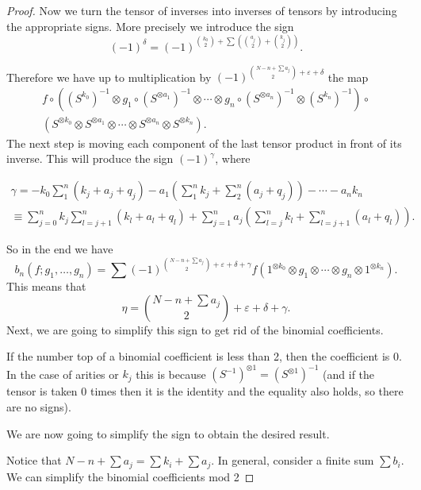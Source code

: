 \documentclass[Thesis.tex]{subfiles}
\begin{document}
\begin{proof}
 Now we turn the tensor of inverses into inverses of tensors by introducing the appropriate signs. More precisely we introduce the sign
 \begin{equation}\label{delta}
 (-1)^{\delta}=(-1)^{\binom{k_0}{2}+\sum(\binom{a_j}{2}+\binom{k_j}{2})}.
  \end{equation}
 
  
Therefore we have up to multiplication by $(-1)^{\binom{N-n+\sum a_j}{2}+\varepsilon+\delta}$ the map
\begin{gather*}
 f\circ((S^{k_0})^{-1}\otimes  g_1\circ (S^{\otimes a_1})^{-1}\otimes\cdots \otimes  g_n\circ (S^{\otimes a_n})^{-1}\otimes  (S^{k_n})^{-1})\circ\\ (S^{\otimes k_0}\otimes S^{\otimes a_1}\otimes\cdots\otimes S^{\otimes a_n}\otimes S^{\otimes k_n}).
 \end{gather*}
 The next step is moving each component of the last tensor product in front of its inverse. This will produce the sign $(-1)^\gamma$, where
 
 \begin{gather*}\gamma=-k_0\sum_1^n(k_j+a_j+q_j)-a_1\left(\sum_1^n k_j+\sum_2^n (a_j+q_j)\right)-\cdots -a_nk_n\\\equiv \sum_{j=0}^nk_j\sum_{l=j+1}^n(k_l+a_l+q_l)+\sum_{j=1}^na_j\left(\sum_{l=j}^nk_l+\sum_{l=j+1}^n(a_l+q_l)\right).
 \end{gather*}
 

 
 So in the end we have
 \[
 b_n(f;g_1,\dots,g_n)=\sum(-1)^{\binom{N-n+\sum a_j}{2}+\varepsilon+\delta+\gamma}f(1^{\otimes k_0}\otimes g_1\otimes\cdots\otimes g_n\otimes 1^{\otimes k_n}).
 \]
This means that 
 \[\eta=\binom{N-n+\sum a_j}{2}+\varepsilon+\delta+\gamma.\]
  Next, we are going to simplify this sign to get rid of the binomial coefficients.
 
 \begin{remark}
If the number top of a binomial coefficient is less than 2, then the coefficient is 0. In the case of arities or $k_j$ this is because $(S^{-1})^{\otimes 1}=(S^{\otimes 1})^{-1}$ (and if the tensor is taken 0 times then it is the identity and the equality also holds, so there are no signs).
\end{remark}


We are now going to simplify the sign to obtain the desired result.

Notice that $N-n+\sum a_j=\sum k_i +\sum a_j$. In general, consider a finite sum $\sum b_i$. We can simplify the binomial coefficients mod 2


\end{proof}
\end{document}

